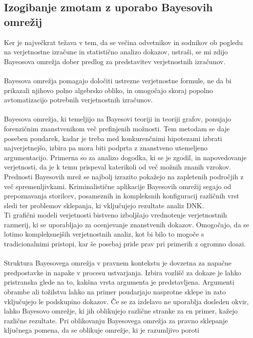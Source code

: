 \documentclass[12pt,a4paper]{amsart}
\theoremstyle{definition} %
\theoremstyle{plain} %
\begin{document}
\subsection{Izogibanje zmotam z uporabo Bayesovih omrežij}
Ker je največkrat težava v tem, da se večina odvetnikov in sodnikov ob pogledu na verjetnostne izračune in statistično analizo dokazov, ustraši, se mi 
zdijo Bayeosova omrežja dober predlog za predstavitev verjetnostnih izračunov. \\\\
Bayesova omrežja pomagajo določiti ustrezne verjetnostne formule, ne da bi prikazali njihovo polno algebrsko obliko, in omogočajo
skoraj popolno avtomatizacijo potrebnih verjetnostnih izračunov.\\\\
Bayesova omrežja, ki temeljijo na Bayesovi teoriji in teoriji grafov, ponujajo forenzičnim znanstvenikom več prefinjenih možnosti. Tem metodam
se daje poseben poudarek, kadar je treba med konkurenčnimi hipotezami izbrati najverjetnejšo, izbira pa mora biti podprta z znanstveno utemeljeno
argumentacijo. Primerna so za analizo dogodka, ki se je zgodil, in napovedovanje verjetnosti, da je k temu prispeval katerikoli od več možnih
znanih vzrokov. Prednosti Bayesovih mrež se najbolj izrazito pokažejo na zapletenih področjih z več spremenljivkami. Kriminalistične aplikacije
Bayesovih omrežij segajo od prepoznavanja storilcev, posameznih in kompleksnih konfiguracij različnih vrst sledi ter problemov sklepanja, ki
vključujejo rezultate analiz DNK.\\
Ti grafični modeli verjetnosti bistveno izboljšajo vrednotenje verjetnostnih razmerij, ki se uporabljajo za ocenjevanje znanstvenih dokazov.
Omogočajo, da se lotimo kompleksnejših verjetnostnih analiz, kot bi bilo to mogoče s tradicionalnimi pristopi, kar še posebaj pride prav pri primerih z ogromno doazi. \\\\
Struktura Bayesovega omrežja v pravnem kontekstu je dovzetna za napačne predpostavke in napake v procesu ustvarjanja. Izbira vozlišč za dokaze je lahko
pristranska glede na to, kakšna vrsta argumenta je predstavljena. Argumenti obrambe ali tožilstva lahko na primer poudarjajo nasprotne sklepe
in zato vključujejo le podskupino dokazov. Če se za izdelavo ne uporablja dosleden okvir, lahko Bayesovo omrežje, ki jih oblikujejo različne stranke za en
primer, kažejo različne rezultate. Pri oblikovanju Bayesovega omrežja za pravno sklepanje ključnega pomena, da se oblikuje omrežje, ki je razumljivo poroti
\end{document}
